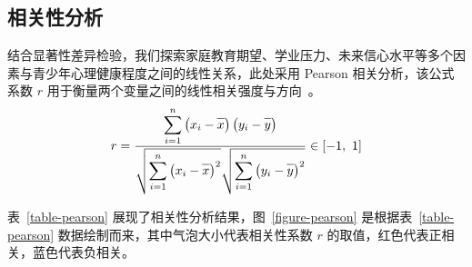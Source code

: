 \documentclass[zihao = -4, linespread = 1.5]{article}
\newcommand{\barline}[1]{\overline{#1\rule{0pt}{1.5ex}}}
\begin{document}
\subsection{相关性分析}
结合显著性差异检验，我们探索家庭教育期望、学业压力、未来信心水平等多个因素与青少年心理健康程度之间的线性关系，此处采用 Pearson 相关分析，该公式系数 $r$ 用于衡量两个变量之间的线性相关强度与方向~\citep{Pearson}。
\[ r=\dfrac{\displaystyle\sum_{i=1}^{n}\left(x_i-\barline{x}\right)\left(y_i-\barline{y}\right)}{\sqrt{\displaystyle\sum_{i=1}^{n}\left(x_i-\barline{x}\right)^2}\sqrt{\displaystyle\sum_{i=1}^{n}\left(y_i-\barline{y}\right)^2}}\in[-1,\ 1] \]

表~\ref{table-pearson} 展现了相关性分析结果，图~\ref{figure-pearson} 是根据表~\ref{table-pearson} 数据绘制而来，其中气泡大小代表相关性系数 $r$ 的取值，红色代表正相关，蓝色代表负相关。
\end{document}
